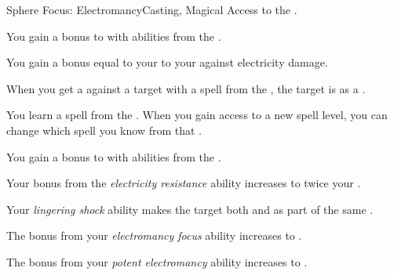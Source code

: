     \begin{feat}{Sphere Focus: Electromancy}{Casting, Magical}
        \featpre Access to the  .

         You gain a  bonus to  with abilities from the  .

         You gain a bonus equal to your  to your  against electricity damage.

         When you get a  against a target with a spell from the  , the target is  as a .

         You learn a spell from the  .
        When you gain access to a new spell level, you can change which spell you know from that .

         You gain a  bonus to  with abilities from the  .

         Your bonus from the \textit{electricity resistance} ability increases to twice your .

         Your \textit{lingering shock} ability makes the target both  and  as part of the same .

         The bonus from your \textit{electromancy focus} ability increases to .

         The bonus from your \textit{potent electromancy} ability increases to .
    \end{feat}

